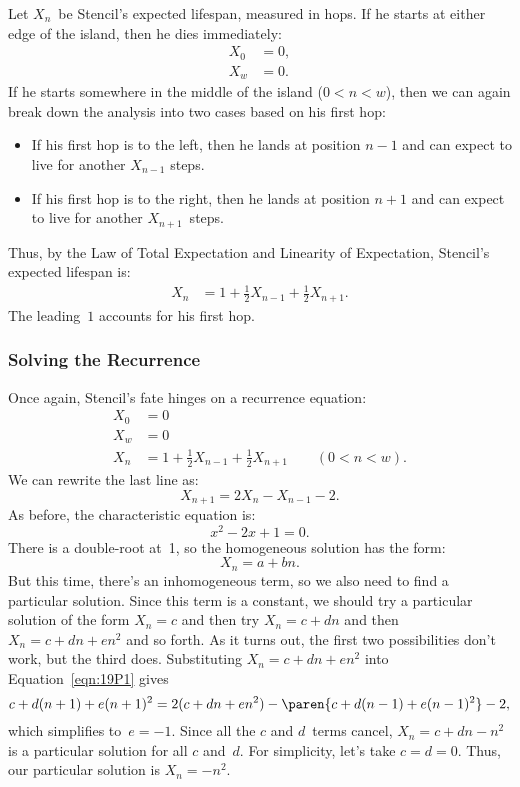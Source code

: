 Let $X_n$~be Stencil's expected lifespan, measured in hops.  If he
starts at either edge of the island, then he dies immediately:
%
\begin{align*}
X_0 & = 0, \\
X_w & = 0.
\end{align*}
%
If he starts somewhere in the middle of the island ($0 < n < w$), then
we can again break down the analysis into two cases based on his first
hop:
%
\begin{itemize}

\item

If his first hop is to the left, then he lands at position $n-1$ and
can expect to live for another $X_{n-1}$ steps.

\item

If his first hop is to the right, then he lands at position $n+1$ and
can expect to live for another $X_{n+1}$~steps.

\end{itemize}
%
Thus, by the Law of Total Expectation and Linearity of Expectation,
Stencil's expected lifespan is:
%
\begin{align*}
    X_n & = 1 + \frac{1}{2} X_{n-1} + \frac{1}{2} X_{n+1}.
\end{align*}
%
The leading~$1$ accounts for his first hop.

\subsubsection{Solving the Recurrence}

Once again, Stencil's fate hinges on a recurrence equation:
%
\[
\begin{array}{rl}
X_0 & = 0 \\
X_w & = 0 \\
X_n & = 1 + \frac{1}{2} X_{n-1} + \frac{1}{2} X_{n+1} \qquad (0 < n < w).
\end{array}
\]
%
We can rewrite the last line as:
%
\begin{equation}\label{eqn:19P1}
    X_{n+1} = 2 X_n - X_{n-1} - 2.
\end{equation}
%
As before, the characteristic equation is:
%
\[
    x^2 - 2 x + 1 = 0.
\]
%
There is a double-root at~1, so the homogeneous solution has the form:
%
\[
    X_n = a + b n.
\]
%
But this time, there's an inhomogeneous term, so we also need to find a
particular solution.  Since this term is a constant, we should try a
particular solution of the form $X_n = c$ and then try $X_n = c + d n$
and then $X_n = c + d n + e n^2$ and so forth.  As it turns out, the
first two possibilities don't work, but the third does.  Substituting
$X_n = c + d n + e n^2$ into Equation~\ref{eqn:19P1} gives
%
\begin{equation*}
c + d(n+1) + e(n+1)^2 = 2 (c + dn + en^2)
    - \paren{c + d(n-1) + e(n-1)^2} - 2,
\end{equation*}
which simplifies to~$e = -1$.  Since all the $c$ and $d$~terms cancel,
$X_n = c + d n - n^2$ is a particular solution for all $c$ and~$d$.
For simplicity, let's take $c = d = 0$.  Thus, our particular solution
is $X_n = - n^2$.

